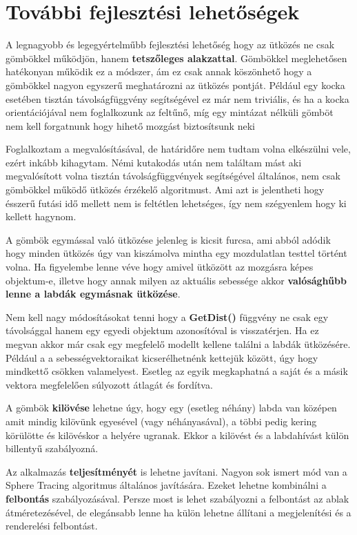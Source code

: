 \chapter{További fejlesztési lehetőségek}
\label{ch:more}

A legnagyobb és legegyértelműbb fejlesztési lehetőség hogy az ütközés ne csak gömbökkel működjön, hanem \textbf{tetszőleges alakzattal}. Gömbökkel meglehetősen hatékonyan működik ez a módszer, ám ez csak annak köszönhető hogy a gömbökkel nagyon egyszerű meghatározni az ütközés pontját. Például egy kocka esetében tisztán távolságfüggvény segítségével ez már nem triviális, és ha a kocka orientációjával nem foglalkozunk az feltűnő, míg egy mintázat nélküli gömböt nem kell forgatnunk hogy hihető mozgást biztosítsunk neki

Foglalkoztam a megvalósításával, de határidőre nem tudtam volna elkészülni vele, ezért inkább kihagytam. Némi kutakodás után nem találtam mást aki megvalósított volna tisztán távolságfüggvények segítségével általános, nem csak gömbökkel működő ütközés érzékelő algoritmust. Ami azt is jelentheti hogy ésszerű futási idő mellett nem is feltétlen lehetséges, így nem szégyenlem hogy ki kellett hagynom.

A gömbök egymással való ütközése jelenleg is kicsit furcsa, ami abból adódik hogy minden ütközés úgy van kiszámolva mintha egy mozdulatlan testtel történt volna. Ha figyelembe lenne véve hogy amivel ütközött az mozgásra képes objektum-e, illetve hogy annak milyen az aktuális sebessége akkor \textbf{valósághűbb lenne a labdák egymásnak ütközése}.

Nem kell nagy módosításokat tenni hogy a \textbf{GetDist()} függvény ne csak egy távolsággal hanem egy egyedi objektum azonosítóval is visszatérjen. Ha ez megvan akkor már csak egy megfelelő modellt kellene találni a labdák ütközésére. Például a a sebességvektoraikat kicserélhetnénk kettejük között, úgy hogy mindkettő csökken valamelyest. Esetleg az egyik megkaphatná a saját és a másik vektora megfelelően súlyozott átlagát és fordítva.

A gömbök \textbf{kilövése} lehetne úgy, hogy egy (esetleg néhány) labda van középen amit mindig kilövünk egyesével (vagy néhányasával), a többi pedig kering körülötte és kilövéskor a helyére ugranak. Ekkor a kilövést és a labdahívást külön billentyű szabályozná. 

Az alkalmazás \textbf{teljesítményét} is lehetne javítani. Nagyon sok ismert mód van a Sphere Tracing algoritmus általános javítására. Ezeket lehetne kombinálni a \textbf{felbontás} szabályozásával. Persze most is lehet szabályozni a felbontást az ablak átméretezésével, de elegánsabb lenne ha külön lehetne állítani a megjelenítési és a renderelési felbontást.

